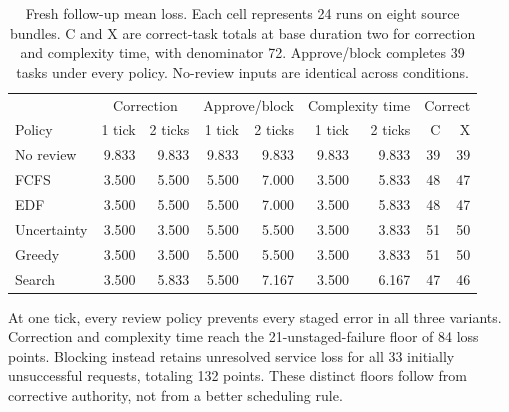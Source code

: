 \begin{table}[t]

\caption{Fresh follow-up mean loss. Each cell represents 24 runs on eight source bundles. C and X are correct-task totals at base duration two for correction and complexity time, with denominator 72. Approve/block completes 39 tasks under every policy. No-review inputs are identical across conditions.}

\label{tab:fresh}\centering\small

\begin{tabular}{lrrrrrrrr}

\toprule

& \multicolumn{2}{c}{Correction} & \multicolumn{2}{c}{Approve/block} & \multicolumn{2}{c}{Complexity time} & \multicolumn{2}{c}{Correct} \\ Policy & 1 tick & 2 ticks & 1 tick & 2 ticks & 1 tick & 2 ticks & C & X \\

\midrule

No review & 9.833 & 9.833 & 9.833 & 9.833 & 9.833 & 9.833 & 39 & 39 \\

FCFS & 3.500 & 5.500 & 5.500 & 7.000 & 3.500 & 5.833 & 48 & 47 \\

EDF & 3.500 & 5.500 & 5.500 & 7.000 & 3.500 & 5.833 & 48 & 47 \\

Uncertainty & 3.500 & 3.500 & 5.500 & 5.500 & 3.500 & 3.833 & 51 & 50 \\

Greedy & 3.500 & 3.500 & 5.500 & 5.500 & 3.500 & 3.833 & 51 & 50 \\

Search & 3.500 & 5.833 & 5.500 & 7.167 & 3.500 & 6.167 & 47 & 46 \\

\bottomrule

\end{tabular}

\end{table}



At one tick, every review policy prevents every staged error in all three variants. Correction and complexity time reach the 21-unstaged-failure floor of 84 loss points. Blocking instead retains unresolved service loss for all 33 initially unsuccessful requests, totaling 132 points. These distinct floors follow from corrective authority, not from a better scheduling rule.


